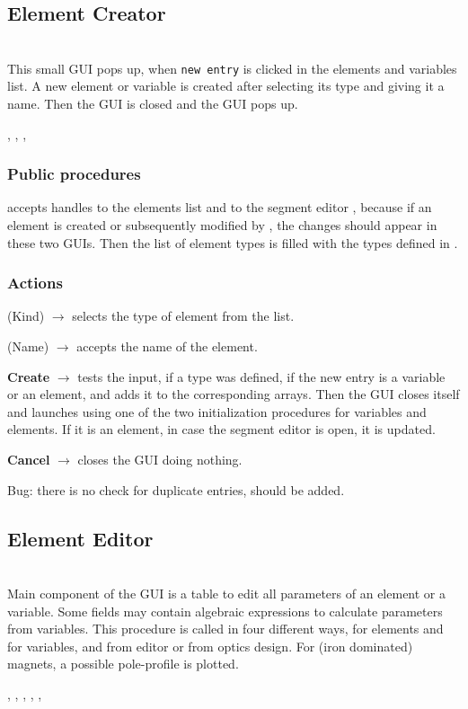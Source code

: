 \documentclass[12pt]{article}
\newcommand\code[1]{{\tt #1}}
\newcommand{\ofld}[1]{\colorbox{black!15}{{{\color{black}\bf #1}}}}
\newcommand{\ofldx}[1]{\colorbox{black!15}{{\color{black}(#1)}}}
\newcommand\guico[1]{{\color{blue}\code{#1}}}
\newcommand{\evcod}[2]{\ofld{#1} $\rightarrow$ \guico{#2}}
\newcommand{\evcodx}[2]{\ofldx{#1} $\rightarrow$ \guico{#2}}
\newcommand{\opagui}[1]{\colorbox{blue!20}{{\color{black}\code{#1}}}}
\newcommand{\oguih}[2]{\subsection{\label{#2}#1}{\Huge\opagui{#2}}\\}
\newcommand{\ogui}[1]{\hyperref[#1]{\opagui{#1}}}
\newcommand{\opaguif}[1]{\colorbox{violet!30}{{\color{black}\code{#1}}}}
\newcommand{\oguif}[1]{\hyperref[#1]{\opaguif{#1}}}
\newcommand{\opauni}[1]{\colorbox{orange!30}{{\color{black}\code{#1}}}}
\newcommand{\ouni}[1]{\hyperref[#1]{\opauni{#1}}}
\newcommand{\uses}[1]{\flushleft {\bf Uses:} #1}
\newcommand{\desc}[1]{#1}
\newcommand{\act}[1]{\subsubsection*{Actions} #1}
\newcommand{\ppro}[1]{\subsubsection*{Public procedures} #1}
\newcommand{\todo}[1]{{\color{red} #1}}
\begin{document}
\oguih{Element Creator}{oelecreate} 

\desc{This small GUI pops up, when \code{new entry} is clicked in the \ouni{opaeditor} elements and variables list. A new element or variable is created after selecting its type and giving it a name. Then the GUI is closed and the \ogui{oeleedit} GUI pops up.}

\uses{\ouni{globlib}, \ouni{editorlib}, \ogui{oeleedit}, \ogui{osegedit} }   
\ppro{
\guico{Init} accepts handles to the \ogui{opaeditor} elements list and to the segment editor \ouni{osegedit}, because if an element is created or subsequently modified by \ogui{oeleedit}, the changes should appear in these two GUIs. Then the list of element types is filled with the types defined in \ouni{globlib}.
}

\act{
\evcodx{Kind}{ComETypeChange} selects the type of element from the list.

\evcodx{Name}{EdENameChange} accepts the name of the element.

\evcod{Create}{ButCreClick} tests the input, if a type was defined, if the new entry is a variable or an element, and adds it to the corresponding arrays. Then the GUI closes itself and launches \ogui{oeleedit} using one of the two initialization procedures for variables and elements. If it is an element, in case  the segment editor \ogui{osegedit} is open, it is updated.

\evcod{Cancel}{ButCanClick} closes the GUI doing nothing.
}

\todo{Bug: there is no check for duplicate entries, should be added.}


\oguih{Element Editor}{oeleedit} 

\desc{
Main component of the GUI is a table to edit all parameters of an element or a variable. Some fields may contain algebraic expressions to calculate parameters from variables. This procedure is called in four different ways, for elements and for variables, and from editor or from optics design. For (iron dominated) magnets, a possible pole-profile is plotted.
}

\uses{\ouni{globlib}, \ouni{editorlib}, \ouni{varlib}, \ouni{linoplib}, \oguif{comfigureframe}, \ouni{comauxlib}}
\end{document}
